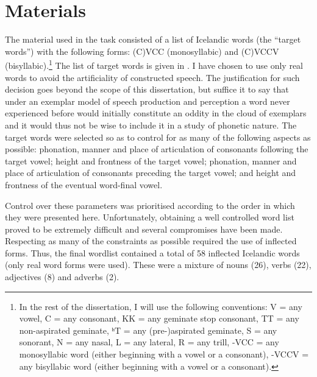 \documentclass[11pt,a4paper,openany]{memoir}\usepackage[]{graphicx}\usepackage[]{color}
\begin{document}

\section{Materials}
\label{s:materials}
The material used in the task consisted of a list of Icelandic words (the ``target words'') with the following forms: (C)VCC (monosyllabic) and (C)VCCV (bisyllabic).\footnote{In the rest of the dissertation, I will use the following conventions: V = any vowel, C = any consonant, KK = any geminate stop consonant, TT = any non-aspirated geminate, ʰT = any (pre-)aspirated geminate, S = any sonorant, N = any nasal, L = any lateral, R = any trill, -VCC = any monosyllabic word (either beginning with a vowel or a consonant), -VCCV = any bisyllabic word (either beginning with a vowel or a consonant).}
The list of target words is given in .
I have chosen to use only real words to avoid the artificiality of constructed speech.
The justification for such decision goes beyond the scope of this dissertation, but suffice it to say that under an exemplar model of speech production and perception \citep{johnson1997,pierrehumbert2001,bybee2002,johnson2007} a word never experienced before would initially constitute an oddity in the cloud of exemplars and it would thus not be wise to include it in a study of phonetic nature.
The target words were selected so as to control for as many of the following aspects as possible: phonation, manner and place of articulation of consonants following the target vowel; height and frontness of the target vowel; phonation, manner and place of articulation of consonants preceding the target vowel; and height and frontness of the eventual word-final vowel.

Control over these parameters was prioritised according to the order in which they were presented here.
Unfortunately, obtaining a well controlled word list proved to be extremely difficult and several compromises have been made.
Respecting as many of the constraints as possible required the use of inflected forms.
Thus, the final wordlist contained a total of 58 inflected Icelandic words (only real word forms were used).
These were a mixture of nouns (26), verbs (22), adjectives (8) and adverbs (2).
\end{document}
